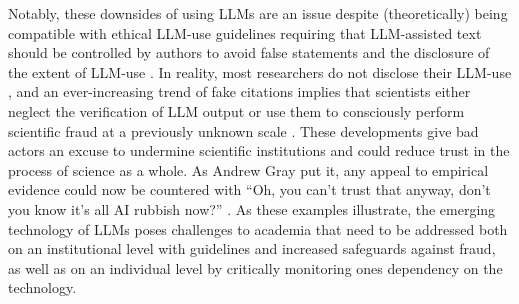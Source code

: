 Notably, these downsides of using LLMs are an issue despite (theoretically) being compatible with ethical LLM-use guidelines requiring that LLM-assisted text should be controlled by authors to avoid false statements and the disclosure of the extent of LLM-use \cite{kim2024research}. 
In reality, most researchers do not disclose their LLM-use \cite{Kousha2024,Kwon2025}, and an ever-increasing trend of fake citations implies that scientists either neglect the verification of LLM output or use them to consciously perform scientific fraud at a previously unknown scale \cite{Kendall2024, topaz2026fabricated, Walters2023}.
These developments give bad actors an excuse to undermine scientific institutions and could reduce trust in the process of science as a whole.
As Andrew Gray put it, any appeal to empirical evidence could now be countered with ``Oh, you can’t trust that anyway, don’t you know it’s all AI rubbish now?'' \cite{Gray2026}.
As these examples illustrate, the emerging technology of LLMs poses challenges to academia that need to be addressed both on an institutional level with guidelines and increased safeguards against fraud, as well as on an individual level by critically monitoring ones dependency on the technology.
